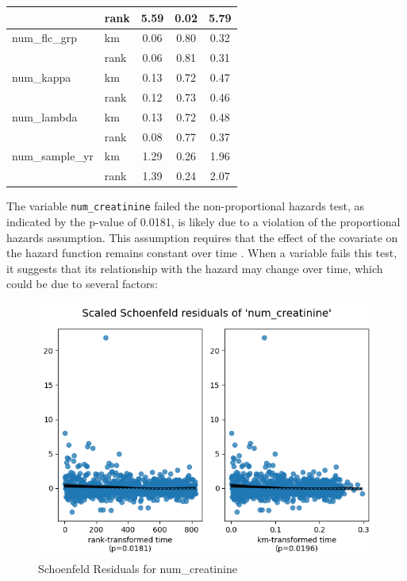 \begin{table}[H]
\begin{tabular}{|l|l|c|c|c|}
                                    & rank & 5.59  & 0.02   & 5.79  \\ \hline
    num\_flc\_grp                    & km   & 0.06  & 0.80   & 0.32  \\ \hline
                                    & rank & 0.06  & 0.81   & 0.31  \\ \hline
    num\_kappa                       & km   & 0.13  & 0.72   & 0.47  \\ \hline
                                    & rank & 0.12  & 0.73   & 0.46  \\ \hline
    num\_lambda                      & km   & 0.13  & 0.72   & 0.48  \\ \hline
                                    & rank & 0.08  & 0.77   & 0.37  \\ \hline
    num\_sample\_yr                  & km   & 1.29  & 0.26   & 1.96  \\ \hline
                                    & rank & 1.39  & 0.24   & 2.07  \\ \hline
    \end{tabular}
    \end{table}

\noindent The variable \texttt{num\_creatinine} failed the non-proportional hazards test, as indicated by the p-value of 0.0181, is likely due to a violation of the proportional hazards assumption. This assumption requires that the effect of the covariate on the hazard function remains constant over time \parencite{kalbfleisch_fifty_2023}. When a variable fails this test, it suggests that its relationship with the hazard may change over time, which could be due to several factors:

\begin{figure}[h]
    \centering
    \includegraphics[width=\linewidth]{Figures/SURV/schoen1.png}
    \caption{Schoenfeld Residuals for num\_creatinine}
    \label{fig:your_label}
\end{figure}

